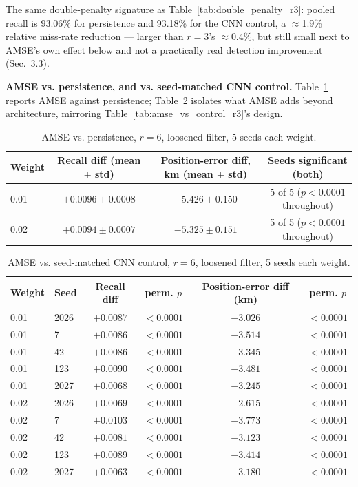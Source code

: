 \documentclass[11pt]{article}
\begin{document}
The same double-penalty signature as Table~\ref{tab:double_penalty_r3}: pooled recall is 93.06\% for persistence and 93.18\% for the CNN control, a $\approx$1.9\% relative miss-rate reduction --- larger than $r=3$'s $\approx$0.4\%, but still small next to AMSE's own effect below and not a practically real detection improvement (Sec.~3.3).

\textbf{AMSE vs. persistence, and vs. seed-matched CNN control.} Table~\ref{tab:amse_vs_persist} reports AMSE against persistence; Table~\ref{tab:amse_vs_control} isolates what AMSE adds beyond architecture, mirroring Table~\ref{tab:amse_vs_control_r3}'s design.

\begin{table}[h]
\centering
\caption{AMSE vs. persistence, $r=6$, loosened filter, 5 seeds each weight.}
\label{tab:amse_vs_persist}
\begin{tabular}{lccc}
\toprule
Weight & Recall diff (mean $\pm$ std) & Position-error diff, km (mean $\pm$ std) & Seeds significant (both) \\
\midrule
0.01 & $+0.0096 \pm 0.0008$ & $-5.426 \pm 0.150$ & 5 of 5 ($p<0.0001$ throughout) \\
0.02 & $+0.0094 \pm 0.0007$ & $-5.325 \pm 0.151$ & 5 of 5 ($p<0.0001$ throughout) \\
\bottomrule
\end{tabular}
\end{table}

\begin{table}[h]
\centering
\caption{AMSE vs. seed-matched CNN control, $r=6$, loosened filter, 5 seeds each weight.}
\label{tab:amse_vs_control}
\begin{tabular}{llcccc}
\toprule
Weight & Seed & Recall diff & perm. $p$ & Position-error diff (km) & perm. $p$ \\
\midrule
0.01 & 2026 & $+0.0087$ & $<0.0001$ & $-3.026$ & $<0.0001$ \\
0.01 & 7 & $+0.0086$ & $<0.0001$ & $-3.514$ & $<0.0001$ \\
0.01 & 42 & $+0.0086$ & $<0.0001$ & $-3.345$ & $<0.0001$ \\
0.01 & 123 & $+0.0090$ & $<0.0001$ & $-3.481$ & $<0.0001$ \\
0.01 & 2027 & $+0.0068$ & $<0.0001$ & $-3.245$ & $<0.0001$ \\
0.02 & 2026 & $+0.0069$ & $<0.0001$ & $-2.615$ & $<0.0001$ \\
0.02 & 7 & $+0.0103$ & $<0.0001$ & $-3.773$ & $<0.0001$ \\
0.02 & 42 & $+0.0081$ & $<0.0001$ & $-3.123$ & $<0.0001$ \\
0.02 & 123 & $+0.0089$ & $<0.0001$ & $-3.414$ & $<0.0001$ \\
0.02 & 2027 & $+0.0063$ & $<0.0001$ & $-3.180$ & $<0.0001$ \\
\bottomrule
\end{tabular}
\end{table}
\end{document}
